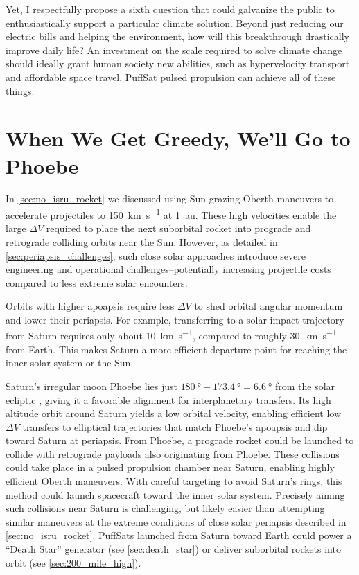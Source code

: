 \documentclass{article}
\begin{document}
Yet, I respectfully propose a sixth question that could galvanize the public to enthusiastically support a particular climate solution. Beyond just reducing our electric bills and helping the environment, how will this breakthrough drastically improve daily life? An investment on the scale required to solve climate change should ideally grant human society new abilities, such as hypervelocity transport and affordable space travel. PuffSat pulsed propulsion can achieve all of these things.  

\section{When We Get Greedy, We'll Go to Phoebe}\label{sec:greedy_phoebe}
In \autoref{sec:no_isru_rocket} we discussed using Sun-grazing Oberth maneuvers to accelerate projectiles to \SI{150}{\kilo\meter\per\second} at \SI{1}{\astronomicalunit}. These high velocities enable the large $\Delta V$ required to place the next suborbital rocket into prograde and retrograde colliding orbits near the Sun.  However, as detailed in \autoref{sec:periapsis_challenges}, such close solar approaches introduce severe engineering and operational challenges--potentially increasing projectile costs compared to less extreme solar encounters.

Orbits with higher apoapsis require less $\Delta V$ to shed orbital angular momentum and lower their periapsis. For example, transferring to a solar impact trajectory from Saturn requires only about \SI{10}{\kilo\meter\per\second}, compared to roughly \SI{30}{\kilo\meter\per\second} from Earth. This makes Saturn a more efficient departure point for reaching the inner solar system or the Sun.

Saturn’s irregular moon Phoebe lies just $\SI{180}{\degree} - \SI{173.4}{\degree} = \SI{6.6}{\degree}$ from the solar ecliptic \cite{phoebe}, giving it a favorable alignment for interplanetary transfers. Its high altitude orbit around Saturn yields a low orbital velocity, enabling efficient low $\Delta V$ transfers to elliptical trajectories that match Phoebe’s apoapsis and dip toward Saturn at periapsis.  From Phoebe, a prograde rocket could be launched to collide with retrograde payloads also originating from Phoebe. These collisions could take place in a pulsed propulsion chamber near Saturn, enabling highly efficient Oberth maneuvers. With careful targeting to avoid Saturn’s rings, this method could launch spacecraft toward the inner solar system. Precisely aiming such collisions near Saturn is challenging, but likely easier than attempting similar maneuvers at the extreme conditions of close solar periapsis described in \autoref{sec:no_isru_rocket}. PuffSats launched from Saturn toward Earth could power a “Death Star” generator (see \autoref{sec:death_star}) or deliver suborbital rockets into orbit (see \autoref{sec:200_mile_high}).
\end{document}
